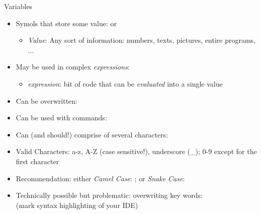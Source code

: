 \begin{frame}{Variables}
%
\begin{itemize}
\item Symols that store some value:  or 
	\begin{itemize}
	\item \emph{Value}: Any sort of information: numbers, texts, pictures, entire programs, ...
	\end{itemize}
\item May be used in complex \emph{expressions}: 
	\begin{itemize}
	\item \emph{expression}: bit of code that can be \emph{evaluated} into a single value
	\end{itemize}
\item Can be overwritten: 
\item Can be used with commands: 
\item Can (and should!) comprise of several characters: 
\item Valid Characters: a-z, A-Z (case sensitive!), underscore (\_); 0-9 except for the first character
\item Recommendation: either \emph{Camel Case}: ; or \emph{Snake Case}: 
\item Technically possible but problematic: overwriting key words:  \\
	(mark syntax highlighting of your IDE)
\end{itemize}
%
\end{frame}


